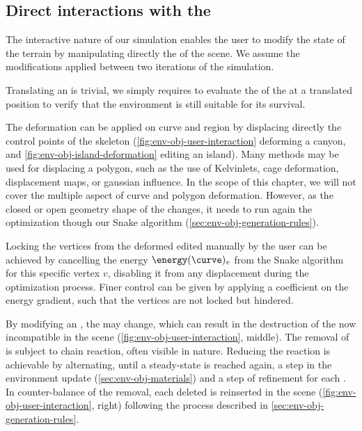 \subsection{Direct interactions with the }
\label{sec:env-obj-manual-interaction}
The interactive nature of our simulation enables the user to modify the state of the terrain by manipulating directly the  of the scene. We assume the modifications applied between two iterations of the simulation.

Translating an  is trivial, we simply requires to evaluate the  of the  at a translated position to verify that the environment is still suitable for its survival.

The deformation can be applied on curve and region  by displacing directly the control points of the skeleton (\cref{fig:env-obj-user-interaction} deforming a canyon, and \cref{fig:env-obj-island-deformation} editing an island). Many methods may be used for displacing a polygon, such as the use of Kelvinlets, cage deformation, displacement maps, or gaussian influence. In the scope of this chapter, we will not cover the multiple aspect of curve and polygon deformation. However, as the closed or open geometry shape of the  changes, it needs to run again the  optimization though our Snake algorithm (\cref{sec:env-obj-generation-rules}).

Locking the vertices from the deformed  edited manually by the user can be achieved by cancelling the energy $\energy(\curve)_v$ from the Snake algorithm for this specific vertex $v$, disabling it from any displacement during the optimization process. Finer control can be given by applying a coefficient on the energy gradient, such that the vertices are not locked but hindered.


By modifying an , the  may change, which can result in the destruction of the now incompatible  in the scene (\cref{fig:env-obj-user-interaction}, middle). The removal of  is subject to chain reaction, often visible in nature. Reducing the reaction is achievable by alternating, until a steady-state is reached again, a step in the environment update (\cref{sec:env-obj-materials}) and a step of  refinement for each . In counter-balance of the removal, each deleted  is reinserted in the scene (\cref{fig:env-obj-user-interaction}, right) following the process described in \cref{sec:env-obj-generation-rules}.

